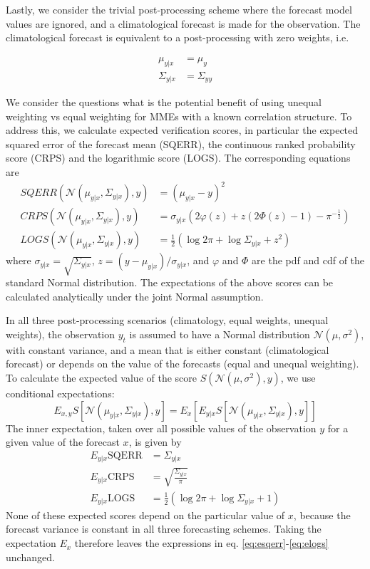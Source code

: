 \documentclass[12pt]{article}
\begin{document}
Lastly, we consider the trivial post-processing scheme where the forecast model values are ignored, and a climatological forecast is made for the observation.
The climatological forecast is equivalent to a post-processing with zero weights, i.e.

\begin{align}
\mu_{y|x} & = \mu_y\\
\Sigma_{y|x} & = \Sigma_{yy}
\end{align}



We consider the questions what is the potential benefit of using unequal weighting vs equal weighting for MMEs with a known correlation structure.
To address this, we calculate expected verification scores, in particular the expected squared error of the forecast mean (SQERR), the continuous ranked probability score (CRPS) and the logarithmic score (LOGS).
The corresponding equations are
%
\begin{align}
SQERR(\mathcal{N}(\mu_{y|x},\Sigma_{y|x}),y) & = (\mu_{y|x} - y)^2\\
CRPS(\mathcal{N}(\mu_{y|x},\Sigma_{y|x}),y) & = \sigma_{y|x}(2\varphi(z)+z(2\Phi(z)-1)-\pi^{-\frac12})\\
LOGS(\mathcal{N}(\mu_{y|x},\Sigma_{y|x}),y) & = \frac12(\log2\pi + \log\Sigma_{y|x} + z^2)
\end{align}
%
where $\sigma_{y|x} = \sqrt{\Sigma_{y|x}}$, $z=(y - \mu_{y|x})/\sigma_{y|x}$, and $\varphi$ and $\Phi$ are the pdf and cdf of the standard Normal distribution.
The expectations of the above scores can be calculated analytically under the joint Normal assumption.


In all three post-processing scenarios (climatology, equal weights, unequal weights), the observation $y_t$ is assumed to have a Normal distribution $\mathcal{N}(\mu, \sigma^2)$, with constant variance, and a mean that is either constant (climatological forecast) or depends on the value of the forecasts (equal and unequal weighting).
To calculate the expected value of the score $S(\mathcal{N}(\mu,\sigma^2),y)$, we use conditional expectations:
%
\begin{equation}
E_{x,y}S\left[\mathcal{N}(\mu_{y|x},\Sigma_{y|x}),y\right] = E_x\left[ E_{y|x} S\left[\mathcal{N}(\mu_{y|x},\Sigma_{y|x}), y\right]\right]
\end{equation}
%
The inner expectation, taken over all possible values of the observation $y$ for a given value of the forecast $x$, is given by
%
\begin{align}
E_{y|x} \mathrm{SQERR} & = \Sigma_{y|x}\label{eq:esqerr}\\
E_{y|x} \mathrm{CRPS} & = \sqrt{\frac{\Sigma_{y|x}}{\pi}}\label{eq:ecrps}\\
E_{y|x} \mathrm{LOGS} & = \frac12\left( \log2\pi + \log\Sigma_{y|x} +1\right)\label{eq:elogs}
\end{align}
%
None of these expected scores depend on the particular value of $x$, because the forecast variance is constant in all three forecasting schemes.
Taking the expectation $E_x$ therefore leaves the expressions in eq. \ref{eq:esqerr}-\ref{eq:elogs} unchanged.
\end{document}
